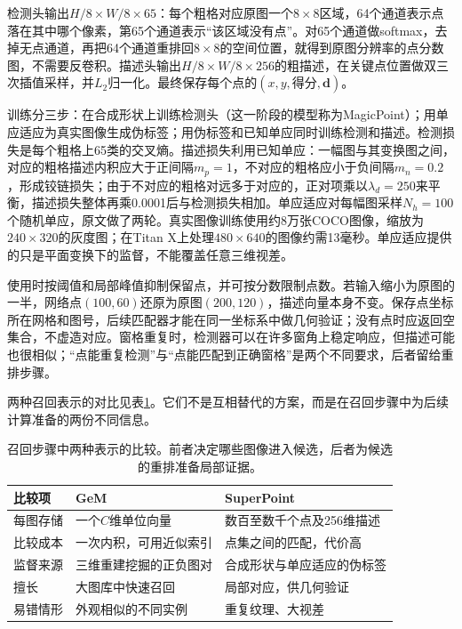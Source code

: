 检测头输出$H/8\times W/8\times65$：每个粗格对应原图一个$8\times8$区域，64个通道表示点落在其中哪个像素，第65个通道表示“该区域没有点”。对65个通道做softmax，去掉无点通道，再把64个通道重排回$8\times8$的空间位置，就得到原图分辨率的点分数图，不需要反卷积。描述头输出$H/8\times W/8\times256$的粗描述，在关键点位置做双三次插值采样，并$L_2$归一化。最终保存每个点的$(x,y,\text{得分},\bm{d})$。

训练分三步：在合成形状上训练检测头（这一阶段的模型称为MagicPoint）；用单应适应为真实图像生成伪标签；用伪标签和已知单应同时训练检测和描述。检测损失是每个粗格上65类的交叉熵。描述损失利用已知单应：一幅图与其变换图之间，对应的粗格描述内积应大于正间隔$m_p=1$，不对应的粗格应小于负间隔$m_n=0.2$，形成铰链损失；由于不对应的粗格对远多于对应的，正对项乘以$\lambda_d=250$来平衡，描述损失整体再乘0.0001后与检测损失相加。单应适应对每幅图采样$N_h=100$个随机单应，原文做了两轮。真实图像训练使用约8万张COCO图像，缩放为$240\times320$的灰度图；在Titan X上处理$480\times640$的图像约需13毫秒。单应适应提供的只是平面变换下的监督，不能覆盖任意三维视差。

使用时按阈值和局部峰值抑制保留点，并可按分数限制点数。若输入缩小为原图的一半，网络点$(100,60)$还原为原图$(200,120)$，描述向量本身不变。保存点坐标所在网格和图号，后续匹配器才能在同一坐标系中做几何验证；没有点时应返回空集合，不虚造对应。窗格重复时，检测器可以在许多窗角上稳定响应，但描述可能也很相似；“点能重复检测”与“点能匹配到正确窗格”是两个不同要求，后者留给重排步骤。

两种召回表示的对比见表\ref{tab:vision-recognition-recall-compare}。它们不是互相替代的方案，而是在召回步骤中为后续计算准备的两份不同信息。

\begin{table}[htbp]
 \centering
 \small
 \begin{tabularx}{\linewidth}{@{}lXX@{}}
 \toprule
 比较项 & GeM & SuperPoint\\
 \midrule
 每图存储 & 一个$C$维单位向量 & 数百至数千个点及256维描述\\
 比较成本 & 一次内积，可用近似索引 & 点集之间的匹配，代价高\\
 监督来源 & 三维重建挖掘的正负图对 & 合成形状与单应适应的伪标签\\
 擅长 & 大图库中快速召回 & 局部对应，供几何验证\\
 易错情形 & 外观相似的不同实例 & 重复纹理、大视差\\
 \bottomrule
 \end{tabularx}
 \caption{召回步骤中两种表示的比较。前者决定哪些图像进入候选，后者为候选的重排准备局部证据。}
 \label{tab:vision-recognition-recall-compare}
\end{table}

